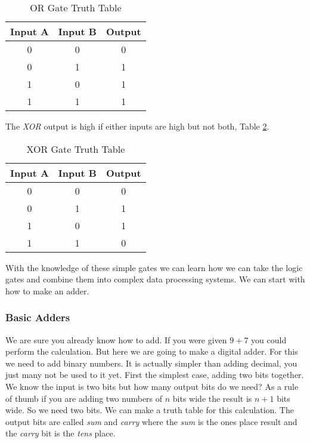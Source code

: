 \begin{table}[h!]  
\begin{center}    
\caption{OR Gate Truth Table} 
\label{tab:ttor} 
\begin{tabular}{|c|c|c|}  
\textbf{Input A} & \textbf{Input B} & \textbf{Output}\\  
\hline  
0 & 0 & 0\\  
0 & 1 & 1\\  
1 & 0 & 1\\  
1 & 1 & 1\\ 
\end{tabular}  
\end{center}
\end{table}

The \emph{XOR} output is high if either inputs are high but not both, Table \ref{tab:ttxor}.

\begin{table}[h!]  
\begin{center}    
\caption{XOR Gate Truth Table} 
\label{tab:ttxor} 
\begin{tabular}{|c|c|c|}  
\textbf{Input A} & \textbf{Input B} & \textbf{Output}\\  
\hline  
0 & 0 & 0\\  
0 & 1 & 1\\  
1 & 0 & 1\\  
1 & 1 & 0\\ 
\end{tabular}  
\end{center}
\end{table}

With the knowledge of these simple gates we can learn how we can take the logic gates and combine them into complex data processing systems. We can start with how to make an adder.
	
\subsubsection{Basic Adders}

We are sure you already know how to add. If you were given $9+7$ you could perform the calculation. But here we are going to make a digital adder. For this we need to add binary numbers. It is actually simpler than adding decimal, you just many not be used to it yet. First the simplest case, adding two bits together. We know the input is two bits but how many output bits do we need? As a rule of thumb if you are adding two numbers of $n$ bits wide the result is $n+1$ bits wide. So we need two bits. We can make a truth table for this calculation. The output bits are called \emph{sum} and \emph{carry} where the \emph{sum} is the ones place result and the \emph{carry} bit is the \emph{tens} place.

